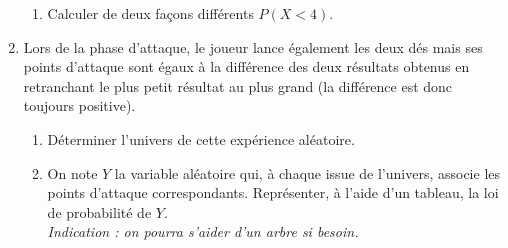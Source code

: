 \documentclass[11pt]{article}
\begin{document}
\begin{enumerate}
\begin{enumerate}
      \item Calculer de deux façons différents $P\left( X<4 \right)$.
    \end{enumerate}
  \item Lors de la phase d'attaque, le joueur lance également les deux dés mais
    ses points d'attaque sont égaux à la différence des deux résultats obtenus
    en retranchant le plus petit résultat au plus grand (la différence est donc
    toujours positive).
    \begin{enumerate}
      \item Déterminer l'univers de cette expérience aléatoire.
      \item On note $Y$ la variable aléatoire qui, à chaque issue de l'univers,
        associe les points d'attaque correspondants. Représenter, à l'aide d'un
        tableau, la loi de probabilité de $Y$.\\
        \emph{Indication : on pourra s'aider d'un arbre si besoin.}
    \end{enumerate}
\end{enumerate}
\end{document}
